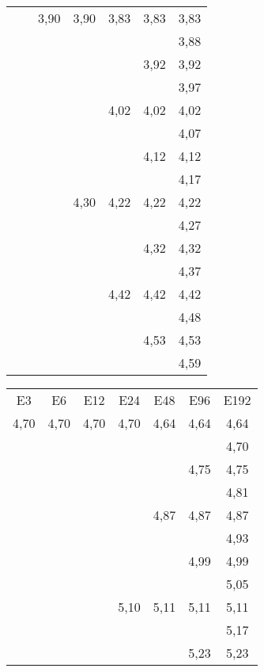 \begin{tiny}
\begin{tabular}{@{}c@{ }c@{ }c@{ }c@{ }c@{ }c@{ }c}
     &      & 3,90 & 3,90 & 3,83 & 3,83 & 3,83 \\
     &      &      &      &      &      & 3,88 \\
     &      &      &      &      & 3,92 & 3,92 \\
     &      &      &      &      &      & 3,97 \\
     &      &      &      & 4,02 & 4,02 & 4,02 \\
     &      &      &      &      &      & 4,07 \\
     &      &      &      &      & 4,12 & 4,12 \\
     &      &      &      &      &      & 4,17 \\
     &      &      & 4,30 & 4,22 & 4,22 & 4,22 \\
     &      &      &      &      &      & 4,27 \\
     &      &      &      &      & 4,32 & 4,32 \\
     &      &      &      &      &      & 4,37 \\
     &      &      &      & 4,42 & 4,42 & 4,42 \\
     &      &      &      &      &      & 4,48 \\
     &      &      &      &      & 4,53 & 4,53 \\
     &      &      &      &      &      & 4,59 
\end{tabular}
\begin{tabular}{@{}c@{ }c@{ }c@{ }c@{ }c@{ }c@{ }c}
  E3 & E6   & E12  & E24  & E48  & E96  & E192 \\
4,70 & 4,70 & 4,70 & 4,70 & 4,64 & 4,64 & 4,64 \\
     &      &      &      &      &      & 4,70 \\
     &      &      &      &      & 4,75 & 4,75 \\
     &      &      &      &      &      & 4,81 \\
     &      &      &      & 4,87 & 4,87 & 4,87 \\
     &      &      &      &      &      & 4,93 \\
     &      &      &      &      & 4,99 & 4,99 \\
     &      &      &      &      &      & 5,05 \\
     &      &      & 5,10 & 5,11 & 5,11 & 5,11 \\
     &      &      &      &      &      & 5,17 \\
     &      &      &      &      & 5,23 & 5,23 \\

\end{tabular}
\end{tiny}

